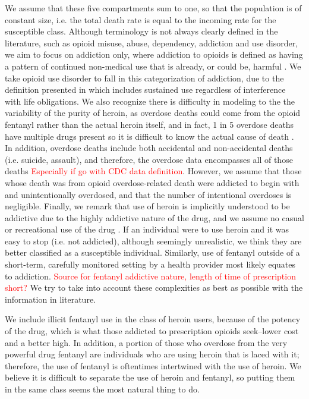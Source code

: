 \documentclass[12pt]{article}
\begin{document}
We assume that these five compartments sum to one, so that the population is of constant size, i.e. the total death rate is equal to the incoming rate for the susceptible class. Although terminology is not always clearly defined in the literature, such as opioid misuse, abuse, dependency, addiction and use disorder, we aim to focus on addiction only, where addiction to opioids is defined as having a pattern of continued non-medical use that is already, or could be, harmful \cite{Vowles}. We take opioid use disorder to fall in this categorization of addiction, due to the definition presented in \cite{SAMSHA2} which includes sustained use regardless of interference with life obligations. We also recognize there is difficulty in modeling to the the variability of the purity of heroin, as overdose deaths could come from the opioid fentanyl rather than the actual heroin itself, and in fact, 1 in 5 overdose deaths have multiple drugs present so it is difficult to know the actual cause of death \cite{CDC4}. In addition, overdose deaths include both accidental and non-accidental deaths (i.e. suicide, assault), and therefore, the overdose data encompasses all of those deaths \textcolor{red}{Especially if go with CDC data definition}.
However, we assume that those whose death was from opioid overdose-related death were addicted to begin with and unintentionally overdosed, and that the number of intentional overdoses is negligible. Finally, we remark that use of heroin is implicitly understood to be addictive due to the highly addictive nature of the drug, and we assume no casual or recreational use of the drug \cite{NIH1}. If an individual were to use heroin and it was easy to stop (i.e. not addicted), although seemingly unrealistic, we think they are better classified as a susceptible individual. Similarly, use of fentanyl outside of a short-term, carefully monitored setting by a health provider most likely equates to addiction. \textcolor{red}{Source for fentanyl addictive nature, length of time of prescription short?} We try to take into account these complexities as best as possible with the information in literature.

We include illicit fentanyl use in the class of heroin users, because of the potency of the drug, which is what those addicted to prescription opioids seek--lower cost and a better high. In addition, a portion of those who overdose from the very powerful drug fentanyl are individuals who are using heroin that is laced with it; therefore, the use of fentanyl is oftentimes intertwined with the use of heroin. We believe it is difficult to separate the use of heroin and fentanyl, so putting them in the same class seems the most natural thing to do. 
\end{document}
